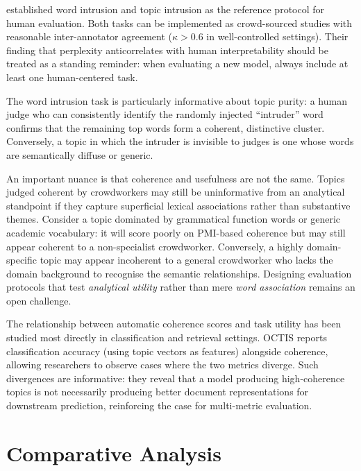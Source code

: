 \documentclass[11pt,a4paper]{article}
\begin{document}
\textcite{chang2009reading} established word intrusion and topic
intrusion as the reference protocol for human evaluation.
Both tasks can be implemented as crowd-sourced studies with reasonable
inter-annotator agreement ($\kappa > 0.6$ in well-controlled settings).
Their finding that perplexity anticorrelates with human interpretability
should be treated as a standing reminder: when evaluating a new model,
always include at least one human-centered task.

The word intrusion task is particularly informative about topic purity:
a human judge who can consistently identify the randomly injected
``intruder'' word confirms that the remaining top words form a
coherent, distinctive cluster.
Conversely, a topic in which the intruder is invisible to judges is
one whose words are semantically diffuse or generic.

An important nuance is that coherence and usefulness are not the same.
Topics judged coherent by crowdworkers may still be uninformative from
an analytical standpoint if they capture superficial lexical
associations rather than substantive themes.
Consider a topic dominated by grammatical function words or generic
academic vocabulary: it will score poorly on PMI-based coherence but
may still appear coherent to a non-specialist crowdworker.
Conversely, a highly domain-specific topic may appear incoherent to
a general crowdworker who lacks the domain background to recognise
the semantic relationships.
Designing evaluation protocols that test \emph{analytical utility}
rather than mere \emph{word association} remains an open challenge.

The relationship between automatic coherence scores and task utility
has been studied most directly in classification and retrieval
settings.
OCTIS reports classification accuracy (using topic vectors as features)
alongside coherence, allowing researchers to observe cases where the
two metrics diverge.
Such divergences are informative: they reveal that a model producing
high-coherence topics is not necessarily producing better document
representations for downstream prediction, reinforcing the case for
multi-metric evaluation.

\section{Comparative Analysis}
\label{sec:comparison}
\end{document}
